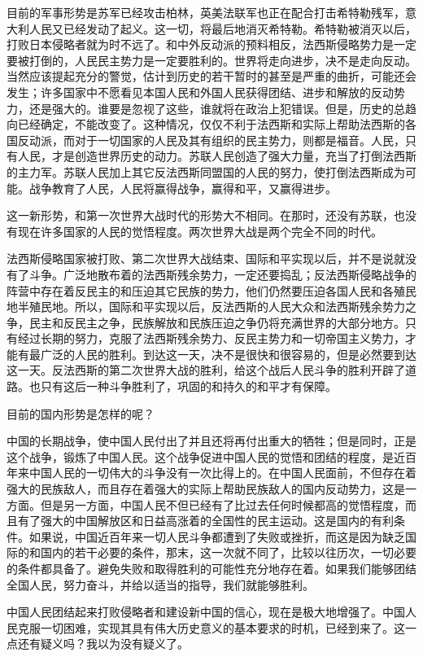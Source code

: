 目前的军事形势是苏军已经攻击柏林，英美法联军也正在配合打击希特勒残军，意大利人民又已经发动了起义。这一切，将最后地消灭希特勒。希特勒被消灭以后，打败日本侵略者就为时不远了。和中外反动派的预料相反，法西斯侵略势力是一定要被打倒的，人民民主势力是一定要胜利的。世界将走向进步，决不是走向反动。当然应该提起充分的警觉，估计到历史的若干暂时的甚至是严重的曲折，可能还会发生；许多国家中不愿看见本国人民和外国人民获得团结、进步和解放的反动势力，还是强大的。谁要是忽视了这些，谁就将在政治上犯错误。但是，历史的总趋向已经确定，不能改变了。这种情况，仅仅不利于法西斯和实际上帮助法西斯的各国反动派，而对于一切国家的人民及其有组织的民主势力，则都是福音。人民，只有人民，才是创造世界历史的动力。苏联人民创造了强大力量，充当了打倒法西斯的主力军。苏联人民加上其它反法西斯同盟国的人民的努力，使打倒法西斯成为可能。战争教育了人民，人民将赢得战争，赢得和平，又赢得进步。

这一新形势，和第一次世界大战时代的形势大不相同。在那时，还没有苏联，也没有现在许多国家的人民的觉悟程度。两次世界大战是两个完全不同的时代。

法西斯侵略国家被打败、第二次世界大战结束、国际和平实现以后，并不是说就没有了斗争。广泛地散布着的法西斯残余势力，一定还要捣乱；反法西斯侵略战争的阵营中存在着反民主的和压迫其它民族的势力，他们仍然要压迫各国人民和各殖民地半殖民地。所以，国际和平实现以后，反法西斯的人民大众和法西斯残余势力之争，民主和反民主之争，民族解放和民族压迫之争仍将充满世界的大部分地方。只有经过长期的努力，克服了法西斯残余势力、反民主势力和一切帝国主义势力，才能有最广泛的人民的胜利。到达这一天，决不是很快和很容易的，但是必然要到达这一天。反法西斯的第二次世界大战的胜利，给这个战后人民斗争的胜利开辟了道路。也只有这后一种斗争胜利了，巩固的和持久的和平才有保障。

目前的国内形势是怎样的呢？

中国的长期战争，使中国人民付出了并且还将再付出重大的牺牲；但是同时，正是这个战争，锻炼了中国人民。这个战争促进中国人民的觉悟和团结的程度，是近百年来中国人民的一切伟大的斗争没有一次比得上的。在中国人民面前，不但存在着强大的民族敌人，而且存在着强大的实际上帮助民族敌人的国内反动势力，这是一方面。但是另一方面，中国人民不但已经有了比过去任何时候都高的觉悟程度，而且有了强大的中国解放区和日益高涨着的全国性的民主运动。这是国内的有利条件。如果说，中国近百年来一切人民斗争都遭到了失败或挫折，而这是因为缺乏国际的和国内的若干必要的条件，那末，这一次就不同了，比较以往历次，一切必要的条件都具备了。避免失败和取得胜利的可能性充分地存在着。如果我们能够团结全国人民，努力奋斗，并给以适当的指导，我们就能够胜利。

中国人民团结起来打败侵略者和建设新中国的信心，现在是极大地增强了。中国人民克服一切困难，实现其具有伟大历史意义的基本要求的时机，已经到来了。这一点还有疑义吗？我以为没有疑义了。

